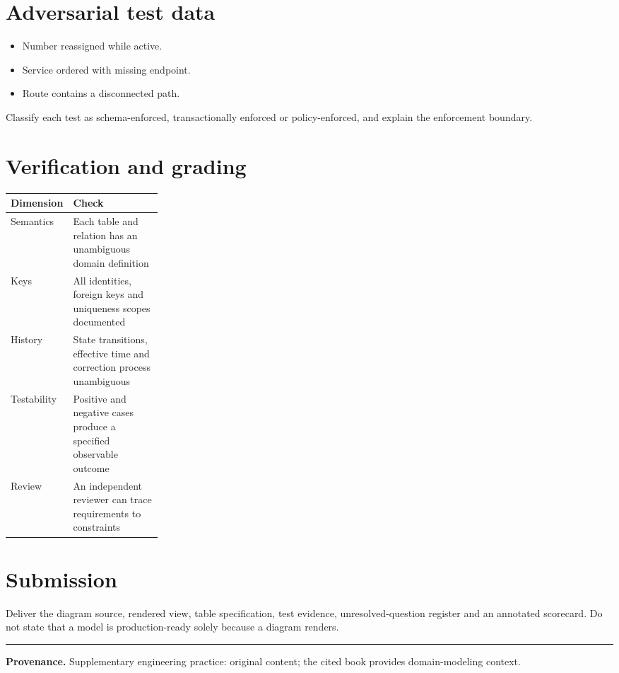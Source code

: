 \documentclass[11pt,letterpaper]{article}
\begin{document}
\section{Adversarial test data}
\begin{itemize}
\item Number reassigned while active.
\item Service ordered with missing endpoint.
\item Route contains a disconnected path.
\end{itemize}
Classify each test as schema-enforced, transactionally enforced or policy-enforced, and explain the enforcement boundary.


\section{Verification and grading}
\begin{tabularx}{\linewidth}{@{}>{\raggedright\arraybackslash}p{0.25\linewidth}>{\raggedright\arraybackslash}X@{}}
\toprule
\textbf{Dimension} & \textbf{Check} \\ 
\midrule
Semantics & Each table and relation has an unambiguous domain definition \\ 
Keys & All identities, foreign keys and uniqueness scopes documented \\ 
History & State transitions, effective time and correction process unambiguous \\ 
Testability & Positive and negative cases produce a specified observable outcome \\ 
Review & An independent reviewer can trace requirements to constraints \\ 
\bottomrule
\end{tabularx}

\section{Submission}
Deliver the diagram source, rendered view, table specification, test evidence, unresolved-question register and an annotated scorecard. Do not state that a model is production-ready solely because a diagram renders.


\vfill
\hrule
{\footnotesize\textbf{Provenance.} Supplementary engineering practice: original content; the cited book provides domain-modeling context.}
\end{document}
